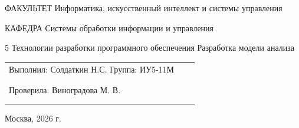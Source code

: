 \newcommand{\baumanAuthors}[3]{%
	\par
	\noindent
	\begingroup
	\setlength{\parindent}{0pt}%
	\setlength{\leftskip}{0pt}%
	\baumanfont
	\mdseries
	\fontsize{12}{14}\selectfont

	\setlength{\tabcolsep}{3pt}%

	\begin{tabularx}{\dimexpr\linewidth-20mm\relax}{%
		@{}
		>{\raggedright\arraybackslash}X
		>{\centering\arraybackslash}p{18mm}
		>{\centering\arraybackslash}p{18mm}
		@{}
		}
		Выполнил: #2\newline
		Группа: #1
		 &
		\shortstack[c]{%
		\rule{16mm}{0.4pt} \\[-1mm]
		{\fontsize{9}{11}\selectfont (подпись)}
		}
		 &
		\shortstack[c]{%
		\rule{16mm}{0.4pt} \\[-1mm]
		{\fontsize{9}{11}\selectfont (дата)}
		}
		\\[10mm]

		Проверила: #3
		 &
		\shortstack[c]{%
		\rule{16mm}{0.4pt} \\[-1mm]
		{\fontsize{9}{11}\selectfont (подпись)}
		}
		 &
		\shortstack[c]{%
		\rule{16mm}{0.4pt} \\[-1mm]
		{\fontsize{9}{11}\selectfont (дата)}
		}
	\end{tabularx}

	\endgroup
	\par
}

\newcommand{\baumanPlace}[2]{%
	\par
	\begingroup
	\centering
	\baumanfont
	\mdseries
	\fontsize{12}{14}\selectfont
	#1, #2 г.%
	\par
	\endgroup
}

\begin{titlepage}
	\thispagestyle{empty}
	\baumanUniversityHeader

	\baumanInfoRow
	{ФАКУЛЬТЕТ}
	{Информатика, искусственный интеллект и системы управления}

	\vspace{4mm}

	\baumanInfoRow
	{КАФЕДРА}
	{Системы обработки информации и управления}

	\vfill

	\baumanLabTitle
	{5}
	{Технологии разработки программного обеспечения}
	{Разработка модели анализа}

	\vfill

	\baumanAuthors
	{ИУ5-11М}
	{Солдаткин Н.С.}
	{Виноградова М. В.}

	\vfill

	\baumanPlace{Москва}{2026}
\end{titlepage}
